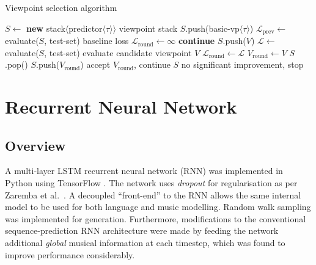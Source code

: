 \documentclass[12pt,a4paper,twoside,openright]{report}
\begin{document}
\begin{algorithm}[H]
  \caption{Viewpoint selection algorithm}
  \label{alg:vp-select}
  \begin{algorithmic}[1]
      \State $S \gets$ \textbf{new}
      stack$\langle$predictor$\langle\tau\rangle\rangle$ 
      \Comment viewpoint stack
      \State $S$.push(basic-vp$\langle\tau\rangle$)
      \State $\mathcal{L}_{\mathrm{prev}} \gets$ evaluate($S$, test-set)
      \Comment baseline loss
      \Loop
        \State $\mathcal{L}_{\mathrm{round}} \gets \infty$
           \textbf{continue}
          \EndIf
          \State $S$.push($V$)
          \State $\mathcal{L} \gets$ evaluate($S$, test-set) 
          \Comment evaluate candidate viewpoint $V$
            \State $\mathcal{L}_{\mathrm{round}} \gets \mathcal{L}$
            \State $V_{\mathrm{round}} \gets V$
          \EndIf
          \State $S$.pop()
        \EndFor
          \State $S$.push($V_{\mathrm{round}}$)
          \Comment accept $V_{\mathrm{round}}$, continue
        \Else
          \State \Return $S$
          \Comment no significant improvement, stop
        \EndIf
      \EndLoop
    \EndFunction
  \end{algorithmic}
\end{algorithm}

\section{Recurrent Neural Network}

\subsection{Overview}

A multi-layer LSTM recurrent neural network (RNN) was implemented in Python
using TensorFlow \cite{abadi2016tensorflow}. The network uses \emph{dropout} for
regularisation as per Zaremba et al.\ \cite{zaremba2014recurrent}. A decoupled
``front-end'' to the RNN allows the same internal model to be used for both
language and music modelling. Random walk sampling was implemented for
generation. Furthermore, modifications to the conventional sequence-prediction
RNN architecture were made by feeding the network additional \emph{global}
musical information at each timestep, which was found to improve performance
considerably.
\end{document}
